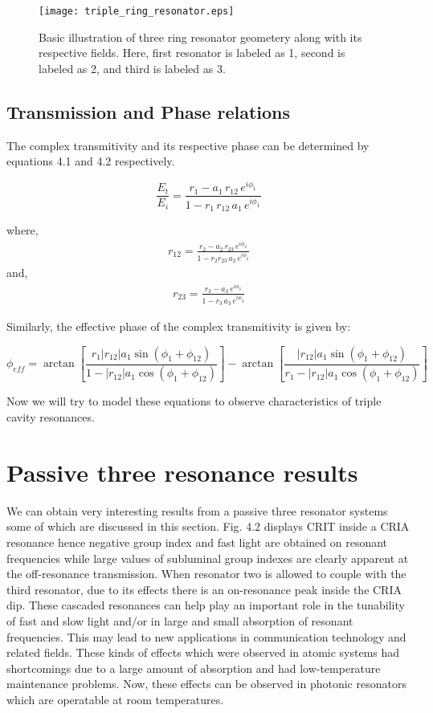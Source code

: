 \begin{figure}[h]
\centering
\texttt{[image: triple\_ring\_resonator.eps]}
\caption{Basic illustration of three ring resonator geometery along with its respective fields. Here, first resonator is labeled as 1, second is labeled as 2, and third is labeled as 3.}
\end{figure}

\subsection{Transmission and Phase relations}
The complex transmitivity and its respective phase can be determined by equations 4.1 and 4.2 respectively. 

\begin{equation}
\frac{E_{t}}{E_{i}} = \frac{r_{1} - a_{1} \, r_{12} \, e^{i\phi_{1}}}{1 - r_{1}\, r_{12}\, a_{1}\, e^{i\phi_{1}}}
\end{equation}

where, 
\begin{align*}
r_{12} = \frac{r_{2} - a_{2}\, r_{23}\, e^{i \phi_{2}}} {1 - r_{2} r_{23}\, a_{2}\, e^{i \phi_{2}}} 
\end{align*}
and,
\begin{align*}
r_{23} = \frac{r_{3} - a_{3}\, e^{i \phi_{3}}} {1 - r_{3}\, a_{3}\, e^{i \phi_{3}}} 
\end{align*}

Similarly, the effective phase of the complex transmitivity is given by:

\begin{equation}
\phi_{eff} = \arctan[{\frac{r_{1} |r_{12}| a_{1} \sin{(\phi_{1} + \phi_{12})}}{1 - |r_{12}| a_{1} \cos{(\phi_{1} + \phi_{12})}}}] - \arctan[{\frac{|r_{12}| a_{1} \sin{(\phi_{1} + \phi_{12})}}{r_{1} - |r_{12}| a_{1} \cos{(\phi_{1} + \phi_{12})}}}]
\end{equation}

Now we will try to model these equations to observe characteristics of triple cavity resonances.

\section{Passive three resonance results}
We can obtain very interesting results from a passive three resonator systems some of which are discussed in this section. Fig. 4.2 displays CRIT inside a CRIA resonance hence negative group index and fast light are obtained on resonant frequencies while large values of subluminal group indexes are clearly apparent at the off-resonance transmission. When resonator two is allowed to couple with the third resonator, due to its effects there is an on-resonance peak inside the CRIA dip. These cascaded resonances can help play an important role in the tunability of fast and slow light and/or in large and small absorption of resonant frequencies. This may lead to new applications in communication technology and related fields. These kinds of effects which were observed in atomic systems had shortcomings due to a large amount of absorption and had low-temperature maintenance problems. Now, these effects can be observed in photonic resonators which are operatable at room temperatures.
